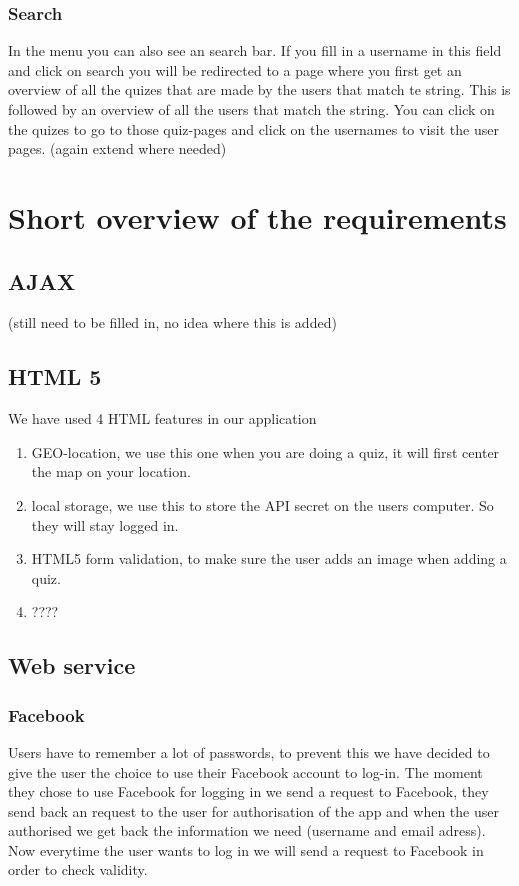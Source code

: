 \documentclass[11pt, oneside]{article}   	%
\begin{document}
\subsubsection{Search}
In the menu you can also see an search bar. If you fill in a username in this field and click on search you will be redirected to a page where you first get an overview of all the quizes that are made by the users that match te string. This is followed by an overview of all the users that match the string. You can click on the quizes to go to those quiz-pages and click on the usernames to visit the user pages.
(again extend where needed)


\section{Short overview of the requirements} %
\subsection{AJAX}
(still need to be filled in, no idea where this is added)

\subsection{HTML 5}
We have used 4 HTML features in our application

\begin{enumerate}
\item GEO-location, we use this one when you are doing a quiz, it will first center the map on your location.
\item local storage, we use this to store the API secret on the users computer. So they will stay logged in.
\item HTML5 form validation, to make sure the user adds an image when adding a quiz.
\item ????
\end{enumerate}


\subsection{Web service}
\subsubsection{Facebook}
Users have to remember a lot of passwords, to prevent this we have decided to give the user the choice to use their Facebook account to log-in. The moment they chose to use Facebook for logging in we send a request to Facebook, they send back an request to the user for authorisation of the app and when the user authorised we get back the information we need (username and email adress). Now everytime the user wants to log in we will send a request to Facebook in order to check validity.
\end{document}
